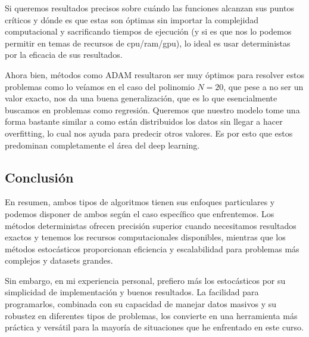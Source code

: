 \documentclass{article}
\begin{document}
Si queremos resultados precisos sobre cuándo las funciones alcanzan sus puntos críticos y dónde es que estas son óptimas sin importar la complejidad computacional y sacrificando tiempos de ejecución (y si es que nos lo podemos permitir en temas de recursos de cpu/ram/gpu), lo ideal es usar deterministas por la eficacia de sus resultados.

Ahora bien, métodos como ADAM resultaron ser muy óptimos para resolver estos problemas como lo veíamos en el caso del polinomio $N=20$, que pese a no ser un valor exacto, nos da una buena generalización, que es lo que esencialmente buscamos en problemas como regresión. Queremos que nuestro modelo tome una forma bastante similar a como están distribuidos los datos sin llegar a hacer overfitting, lo cual nos ayuda para predecir otros valores. Es por esto que estos predominan completamente el área del deep learning.

\subsection{Conclusión}

En resumen, ambos tipos de algoritmos tienen sus enfoques particulares y podemos disponer de ambos según el caso específico que enfrentemos. Los métodos deterministas ofrecen precisión superior cuando necesitamos resultados exactos y tenemos los recursos computacionales disponibles, mientras que los métodos estocásticos proporcionan eficiencia y escalabilidad para problemas más complejos y datasets grandes.

Sin embargo, en mi experiencia personal, prefiero más los estocásticos por su simplicidad de implementación y buenos resultados. La facilidad para programarlos, combinada con su capacidad de manejar datos masivos y su robustez en diferentes tipos de problemas, los convierte en una herramienta más práctica y versátil para la mayoría de situaciones que he enfrentado en este curso.
\end{document}
